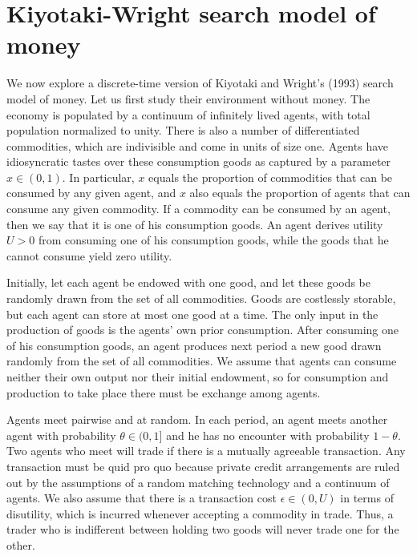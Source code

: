 \section{Kiyotaki-Wright search model of money}

We now explore a discrete-time version of Kiyotaki and Wright's (1993)
search model of money.
Let us first study their environment without money.
The economy is populated by a continuum of infinitely lived agents,
with total population normalized to unity. There is also a
number of differentiated commodities, which are indivisible and
come in units of size one.  Agents have idiosyncratic
tastes over these consumption goods as captured by a parameter
$x\in(0,1)$. In particular, $x$ equals the proportion of commodities
that can be consumed by any given agent, and $x$ also equals
the proportion of agents that can consume any given commodity. If a
commodity can be consumed by an agent, then we say that it is one of
his consumption goods. An
agent derives utility $U>0$ from consuming one of his consumption
goods, while the goods that he cannot consume yield zero utility.

Initially, let each agent be endowed with one good, and let these
goods be randomly drawn from the set of all commodities. Goods are
costlessly storable, but each agent can store at most
one good at a time. The only input in the production of goods
is the agents' own prior consumption. After consuming one of his
consumption goods, an agent produces next period a new good drawn
randomly from the set of all commodities. We assume that agents can
consume neither their own output nor their initial endowment, so
for consumption and production to take place there must be exchange
among agents.

Agents meet pairwise and at random. In each period, an agent meets
another agent with probability $\theta \in (0,1]$ and he has no encounter
with probability $1-\theta$. Two agents who meet will trade if there is
a mutually agreeable transaction. Any transaction must be quid pro quo
because private credit arrangements are ruled out by the assumptions of a
random matching technology and a continuum of agents.
We also assume that there is a transaction cost
$\epsilon \in (0, U)$ in terms of disutility, which is incurred
whenever accepting a commodity in trade. Thus, a trader who is indifferent
between holding two goods will never trade one for the other.

